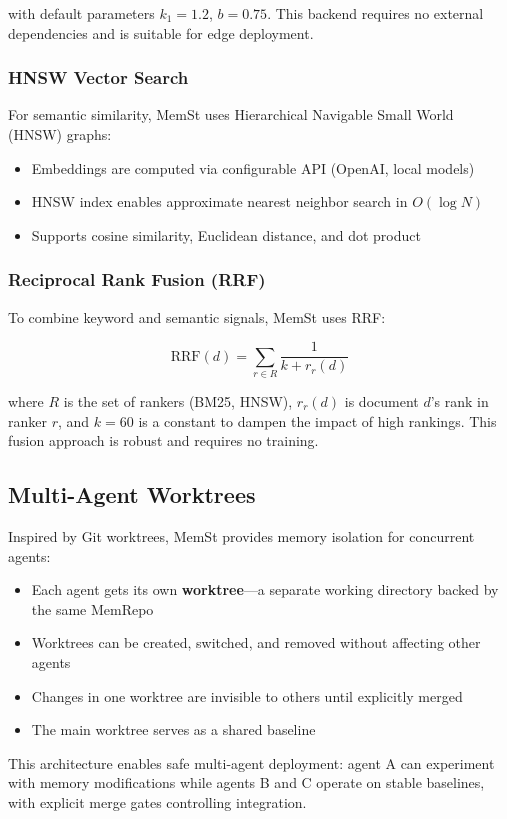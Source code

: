 with default parameters $k_1 = 1.2$, $b = 0.75$. This backend requires no external dependencies and is suitable for edge deployment.

\subsubsection{HNSW Vector Search}

For semantic similarity, MemSt uses Hierarchical Navigable Small World (HNSW) graphs:

\begin{itemize}
    \item Embeddings are computed via configurable API (OpenAI, local models)
    \item HNSW index enables approximate nearest neighbor search in $O(\log N)$
    \item Supports cosine similarity, Euclidean distance, and dot product
\end{itemize}

\subsubsection{Reciprocal Rank Fusion (RRF)}

To combine keyword and semantic signals, MemSt uses RRF:

\begin{equation}
\text{RRF}(d) = \sum_{r \in R} \frac{1}{k + r_r(d)}
\end{equation}

where $R$ is the set of rankers (BM25, HNSW), $r_r(d)$ is document $d$'s rank in ranker $r$, and $k = 60$ is a constant to dampen the impact of high rankings. This fusion approach is robust and requires no training.

\subsection{Multi-Agent Worktrees}

Inspired by Git worktrees, MemSt provides memory isolation for concurrent agents:

\begin{itemize}
    \item Each agent gets its own \textbf{worktree}---a separate working directory backed by the same MemRepo
    \item Worktrees can be created, switched, and removed without affecting other agents
    \item Changes in one worktree are invisible to others until explicitly merged
    \item The main worktree serves as a shared baseline
\end{itemize}

This architecture enables safe multi-agent deployment: agent A can experiment with memory modifications while agents B and C operate on stable baselines, with explicit merge gates controlling integration.
